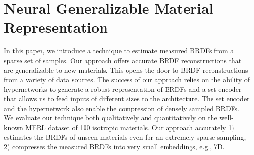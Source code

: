\chapter{Neural Generalizable Material Representation}
\label{ch:HyperBRDF}
In this paper, we introduce a technique to estimate measured BRDFs from a sparse set of samples. Our approach offers accurate BRDF reconstructions that are generalizable to new materials. This opens the door to BRDF reconstructions from a variety of data sources. The success of our approach relies on the ability of hypernetworks to generate a robust representation of BRDFs and a set encoder that allows us to feed inputs of different sizes to the architecture. The set encoder and the hypernetwork also enable the compression of densely sampled BRDFs. We evaluate our technique both qualitatively and quantitatively on the well-known MERL dataset of 100 isotropic materials. Our approach accurately 1) estimates the BRDFs of unseen materials even for an extremely sparse sampling, 2) compresses the measured BRDFs into very small embeddings, e.g., 7D.









